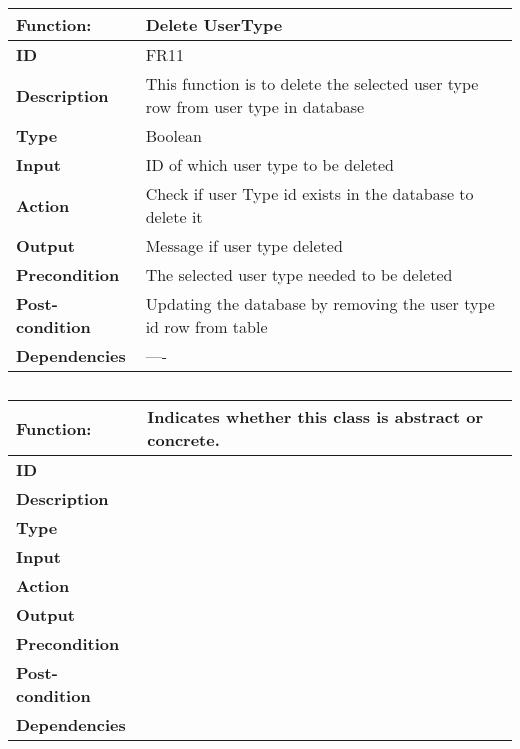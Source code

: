 \documentclass[]{article}
\begin{document}
\FloatBarrier
\begin{table}[h]
\caption{}
\label{tab:my-table}
\begin{tabular}{|p{}|p{}|}
\hline
\textbf{Function:} & Delete UserType 
\\ \hline
\textbf{ID}  & FR11          

\\ \hline
\textbf{Description}  & This function is to delete the selected user type row from user type in database                                                                     
\\ \hline
\textbf{Type}   & Boolean         

\\ \hline
\textbf{Input}  & ID of which user type to be deleted 

\\ \hline
\textbf{Action} & Check if user Type id exists in the database to delete it 

\\ \hline
\textbf{Output}  & Message if user type deleted  

\\ \hline
\textbf{Precondition}   & The selected user type needed to be deleted   

\\ \hline
\textbf{Post-condition}  & Updating the database by removing the user type id row from table 

\\ \hline
\textbf{Dependencies}    & ---- 
\\ \hline
\end{tabular}
\end{table}

\FloatBarrier
\begin{table}[h]
\caption{}
\label{tab:my-table}
\begin{tabular}{|p{}|p{}|}
\hline
\textbf{Function:} & Indicates whether this class is abstract or concrete.
\\ \hline
\textbf{ID}  &            

\\ \hline
\textbf{Description}    &                                                                     
\\ \hline
\textbf{Type}    &         

\\ \hline
\textbf{Input}        & 


\\ \hline
\textbf{Action}            & 

\\ \hline
\textbf{Output}            & 

\\ \hline
\textbf{Precondition}           &   

\\ \hline
\textbf{Post-condition}           & 


\\ \hline
\textbf{Dependencies}           & 
\\ \hline
\end{tabular}
\end{table}
\end{document}
